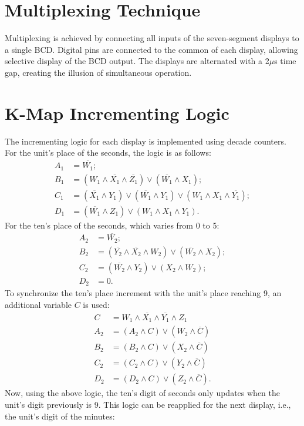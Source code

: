 \documentclass[journal]{IEEEtran}
\begin{document}
	\section{Multiplexing Technique}
	Multiplexing is achieved by connecting all inputs of the seven-segment displays to a single BCD. Digital pins are connected to the common of each display, allowing selective display of the BCD output. The displays are alternated with a 2$\mu$s time gap, creating the illusion of simultaneous operation.
	
	\section{K-Map Incrementing Logic}
	The incrementing logic for each display is implemented using decade counters. For the unit's place of the seconds, the logic is as follows:
	\begin{align}
		A_1 &= \overline{W_1}; \\
		B_1 &= (W_1 \land \overline{X_1} \land \overline{Z_1}) \lor (\overline{W_1} \land X_1);\\
		C_1 &= (\overline{X_1} \land Y_1) \lor (\overline{W_1} \land Y_1) \lor (W_1 \land X_1 \land \overline{Y_1});\\
		D_1 &= (\overline{W_1} \land Z_1) \lor (W_1 \land X_1 \land Y_1).
	\end{align}
	For the ten's place of the seconds, which varies from 0 to 5:
	\begin{align}
		A_2 &= \overline{W_2};\\
		B_2 &= (\overline{Y_2} \land \overline{X_2} \land W_2) \lor (\overline{W_2} \land X_2);\\
		C_2 &= (\overline{W_2} \land Y_2) \lor (X_2 \land W_2);\\
		D_2 &= 0.
	\end{align}
	To synchronize the ten's place increment with the unit's place reaching 9, an additional variable $C$ is used:
	\begin{align}
		C &= W_1 \land \overline{X_1} \land \overline{Y_1} \land Z_1 \\
		A_2 &= (A_2 \land C) \lor (W_2 \land \overline{C}) \\
		B_2 &= (B_2 \land C) \lor (X_2 \land \overline{C}) \\
		C_2 &= (C_2 \land C) \lor (Y_2 \land \overline{C}) \\
		D_2 &= (D_2 \land C) \lor (Z_2 \land \overline{C}).
	\end{align}
	Now, using the above logic, the ten's digit of seconds only updates when the unit's digit previously is 9. This logic can be reapplied for the next display, i.e., the unit's digit of the minutes:
\end{document}
